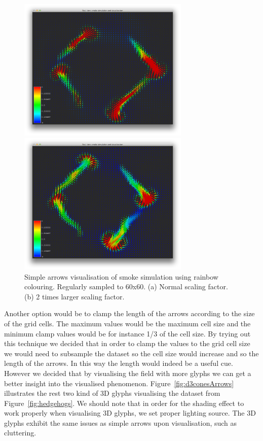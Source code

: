 \begin{figure}[htbp]
\begin{center}
\begin{minipage}[t]{0.48\textwidth}
\includegraphics[height=2.7in]{figures/glyph/simpleArrows.png}
\end{minipage}
\begin{minipage}[t]{0.48\textwidth}
\includegraphics[height=2.7in]{figures/glyph/simpleArrowsScaled.png}
\end{minipage}
\caption{Simple arrows visualisation of smoke simulation using rainbow colouring. Regularly sampled to 60x60. (a) Normal scaling factor. (b) 2 times larger scaling factor.}
\label{fig:simpleArrowsCluttering}
\end{center}
\end{figure}

Another option would be to clamp the length of the arrows according to the size of the grid cells. The maximum values would be the maximum cell size and the minimum clamp values would be for instance 1/3 of the cell size. By trying out this technique we decided that in order to clamp the values to the grid cell size we would need to subsample the dataset so the cell size would increase and so the length of the arrows. In this way the length would indeed be a useful cue. However we decided that by visualising the field with more glyphs we can get a better insight into the visualised phenomenon. Figure~\ref{fig:d3conesArrows} illustrates the rest two kind of 3D glyphs visualising the dataset from Figure~\ref{fig:hedgehogs}. We should note that in order for the shading effect to work properly when visualising 3D glyphs, we set proper lighting source. The 3D glyphs exhibit the same issues as simple arrows upon visualisation, such as cluttering.

